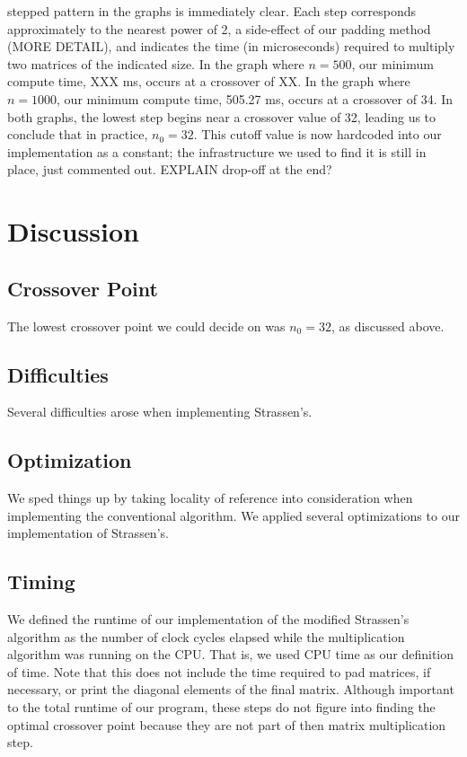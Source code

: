 \documentclass[solution, letterpaper]{cs121}
\begin{document}
stepped pattern in the graphs is immediately clear. Each step corresponds approximately to the nearest power of 2, a side-effect of our padding method (MORE DETAIL), and indicates the time (in microseconds) required to multiply two matrices of the indicated size. In the graph where $n=500$, our minimum compute time, XXX ms, occurs at a crossover of XX. In the graph where $n=1000$, our minimum compute time, 505.27 ms, occurs at a crossover of 34. In both graphs, the lowest step begins near a crossover value of 32, leading us to conclude that in practice, $n_0 = 32$. This cutoff value is now hardcoded into our implementation as a constant; the infrastructure we used to find it is still in place, just commented out. EXPLAIN drop-off at the end?

\section*{Discussion}

\subsection*{Crossover Point}
The lowest crossover point we could decide on was $n_0 = 32$, as discussed above.

\subsection*{Difficulties}
Several difficulties arose when implementing Strassen's.

\subsection*{Optimization}
We sped things up by taking locality of reference into consideration when implementing the conventional algorithm. We applied several optimizations to our implementation of Strassen's.

\subsection*{Timing}
We defined the runtime of our implementation of the modified Strassen's algorithm as the number of clock cycles elapsed while the multiplication algorithm was running on the CPU. That is, we used CPU time as our definition of time. Note that this does not include the time required to pad matrices, if necessary, or print the diagonal elements of the final matrix. Although important to the total runtime of our program, these steps do not figure into finding the optimal crossover point because they are not part of then matrix multiplication step.
\end{document}
